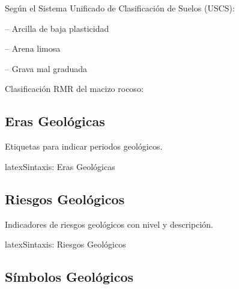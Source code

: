 \noindent
Según el Sistema Unificado de Clasificación de Suelos (USCS):

\noindent
{} -- Arcilla de baja plasticidad

\noindent
{} -- Arena limosa

\noindent
{} -- Grava mal graduada

\vspace{1em}
\noindent
Clasificación RMR del macizo rocoso: 

\subsection{Eras Geológicas}
\label{subsec:eras}

Etiquetas para indicar periodos geológicos.

\begin{codigosimple}{latex}{Sintaxis: Eras Geológicas}
\end{codigosimple}

\noindent
{} \quad
{} \quad
{} \quad
{} \quad
{}

\subsection{Riesgos Geológicos}
\label{subsec:riesgos-geo}

Indicadores de riesgos geológicos con nivel y descripción.

\begin{codigosimple}{latex}{Sintaxis: Riesgos Geológicos}
\risklandslide  \riskflood  \riskseismic
\end{codigosimple}


\vspace{0.5em}
\noindent
\risklandslide \quad \riskflood \quad \riskseismic

\subsection{Símbolos Geológicos}
\label{subsec:simbolos-geo}

